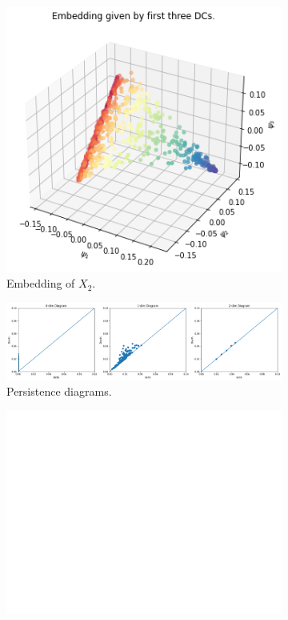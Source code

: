 \begin{figure}[H]
\centering
\begin{subfigure}[b]{0.2\textwidth}
    \includegraphics[width=\textwidth]{figures/topology/X2_embedding.png}
    \caption{Embedding of $X_2$.}
\end{subfigure}
\hfill
\begin{subfigure}[b]{0.75\textwidth}
    \includegraphics[width=\textwidth]{figures/topology/X2_H0.png}
    \caption{Persistence diagrams.}
\end{subfigure}
\begin{subfigure}[b]{0.25\textwidth}
\includegraphics[width=\textwidth]{figures/topology/white.png} 

\end{subfigure}
\end{figure}
